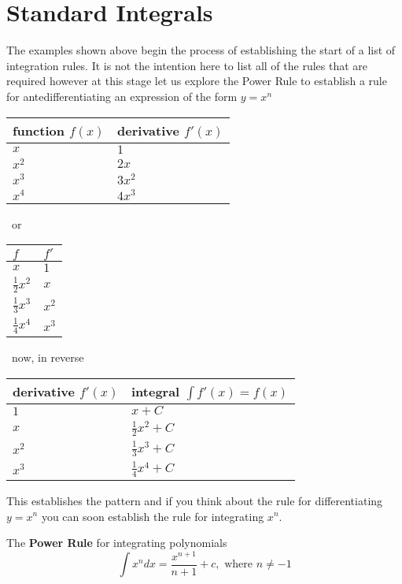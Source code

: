\section{Standard Integrals}
The examples shown above begin the process of establishing the start of a list of integration rules. It
is not the intention here to list all of the rules that are required however at this stage let us explore the Power Rule to establish a rule for antedifferentiating
an expression of the form $y =x^{n}$\medskip  \\

\begin{center}
\begin{tabular}[c]{p{1.5cm}p{1.5cm}}\toprule
function $f(x)$  & derivative $f'(x)$  \\
\midrule
$x$  & $1$  \\
$x^{2}$  & $2 x$  \\
$x^{3}$  & $3 x^{2}$  \\
$x^{4}$  & $4 x^{3}$  \\
\bottomrule
\end{tabular}\ or
\
\begin{tabular}[c]{ll}\toprule
 $f$  & $f'$  \\
\midrule
$x$  & $1$  \\
$\frac{1}{2} x^{2}$  & $x$  \\
$\frac{1}{3} x^{3}$  & $x^{2}$  \\
$\frac{1}{4} x^{4}$  & $x^{3}$  \\
\bottomrule
\end{tabular}\ now, in reverse \
\begin{tabular}[c]{p{2cm}p{2.5cm}}\toprule
derivative $f'(x)$  &  integral $\int f'(x)=f(x)$  \\\midrule
$1$  & $x +C$  \\
$x$  & $\frac{1}{2} x^{2} +C$  \\
$x^{2}$  & $\frac{1}{3} x^{3} +C$  \\
$x^{3}$  & $\frac{1}{4} x^{4} +C$  \\
\bottomrule
\end{tabular}
\end{center}
\bigskip This establishes the pattern and if you think about the rule for differentiating $y =x^{n}$ you can soon establish the rule for integrating $x^{n}$.
\begin{tcolorbox}
	The \textbf{Power Rule} for integrating polynomials
\[\int x^n dx = \frac{x^{n +1}}{n +1} +c, \text{ where }n \neq  -1
\]
\end{tcolorbox}


